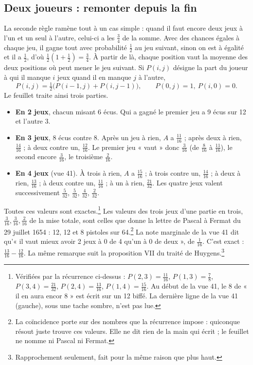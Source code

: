 \documentclass[11pt,a4paper]{article}
\begin{document}
\subsection*{Deux joueurs : remonter depuis la fin}

La seconde règle ramène tout à un cas simple : quand il faut encore deux jeux à
l'un et un seul à l'autre, celui-ci a les \(\frac34\) de la somme. Avec des
chances égales à chaque jeu, il gagne tout avec probabilité \(\frac12\) au
jeu suivant, sinon on est à égalité et il a \(\frac12\), d'où
\(\frac12(1+\frac12)=\frac34\). À partir de là, chaque position vaut la moyenne
des deux positions où peut mener le jeu suivant. Si \(P(i,j)\) désigne la part
du joueur à qui il manque \(i\) jeux quand il en manque \(j\) à l'autre,
\[
P(i,j)=\tfrac12\bigl(P(i-1,j)+P(i,j-1)\bigr),\qquad P(0,j)=1,\ P(i,0)=0 .
\]
Le feuillet traite ainsi trois parties.
\begin{itemize}
  \item \textbf{En 2 jeux}, chacun misant 6 écus. Qui a gagné le premier jeu a
    9 écus sur 12 et l'autre 3.
  \item \textbf{En 3 jeux}, 8 écus contre 8. Après un jeu à rien, \(A\) a
    \(\frac{11}{16}\) ; après deux à rien, \(\frac{14}{16}\) ; à deux contre un,
    \(\frac{12}{16}\). Le premier jeu « vaut » donc \(\frac3{16}\) (de
    \(\frac8{16}\) à \(\frac{11}{16}\)), le second encore \(\frac3{16}\), le
    troisième \(\frac2{16}\).
  \item \textbf{En 4 jeux} (vue 41). À trois à rien, \(A\) a \(\frac{15}{16}\) ;
    à trois contre un, \(\frac{14}{16}\) ; à deux à rien, \(\frac{13}{16}\) ;
    à deux contre un, \(\frac{11}{16}\) ; à un à rien, \(\frac{21}{32}\). Les
    quatre jeux valent successivement \(\frac5{32}\), \(\frac5{32}\),
    \(\frac4{32}\), \(\frac2{32}\).
\end{itemize}
Toutes ces valeurs sont exactes.\footnote{Vérifiées par la récurrence
ci-dessus : \(P(2,3)=\frac{11}{16}\), \(P(1,3)=\frac78\), \(P(3,4)=\frac{21}{32}\),
\(P(2,4)=\frac{13}{16}\), \(P(1,4)=\frac{15}{16}\). Au début de la vue 41, le 8
de « il en aura encor 8 » est écrit sur un 12 biffé. La dernière ligne de la
vue 41 (gauche), sous une tache sombre, n'est pas lue.} Les valeurs des trois
jeux d'une partie en trois, \(\frac3{16},\frac3{16},\frac2{16}\) de la mise
totale, sont celles que donne la lettre de Pascal à Fermat du 29 juillet 1654 :
12, 12 et 8 pistoles sur 64.\footnote{La coïncidence porte sur des nombres que la
récurrence impose : quiconque résout juste trouve ces valeurs. Elle ne dit rien
de la main qui écrit ; le feuillet ne nomme ni Pascal ni Fermat.} La note
marginale de la vue 41 dit qu'« il vaut mieux avoir 2 jeux à 0 de 4 qu'un à 0 de
deux », de \(\frac1{16}\). C'est exact : \(\frac{13}{16}-\frac{12}{16}\). La même
remarque suit la proposition VII du traité de Huygens.\footnote{Rapprochement
seulement, fait pour la même raison que plus haut.}
\end{document}
